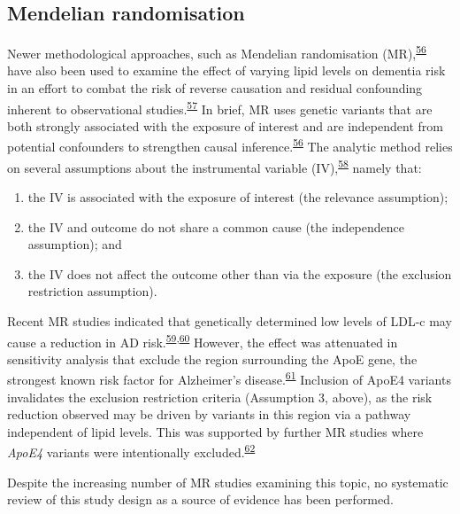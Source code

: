 \documentclass[a4paper, twoside]{templates/ociamthesis}
\providecommand{\tightlist}{%
  \setlength{\itemsep}{0pt}\setlength{\parskip}{0pt}}
\begin{document}
\hypertarget{mendelian-randomisation}{%
\subsection{Mendelian randomisation}\label{mendelian-randomisation}}

Newer methodological approaches, such as Mendelian randomisation (MR),\textsuperscript{\protect\hyperlink{ref-daveysmith2014}{56}} have also been used to examine the effect of varying lipid levels on dementia risk in an effort to combat the risk of reverse causation and residual confounding inherent to observational studies.\textsuperscript{\protect\hyperlink{ref-greenland2000}{57}} In brief, MR uses genetic variants that are both strongly associated with the exposure of interest and are independent from potential confounders to strengthen causal inference.\textsuperscript{\protect\hyperlink{ref-daveysmith2014}{56}} The analytic method relies on several assumptions about the instrumental variable (IV),\textsuperscript{\protect\hyperlink{ref-davies2018}{58}} namely that:

\begin{enumerate}
\def\labelenumi{\arabic{enumi}.}
\tightlist
\item
  the IV is associated with the exposure of interest (the relevance assumption);
\item
  the IV and outcome do not share a common cause (the independence assumption); and
\item
  the IV does not affect the outcome other than via the exposure (the exclusion restriction assumption).
\end{enumerate}

Recent MR studies indicated that genetically determined low levels of LDL-c may cause a reduction in AD risk.\textsuperscript{\protect\hyperlink{ref-larsson2017c}{59},\protect\hyperlink{ref-ostergaard2015}{60}} However, the effect was attenuated in sensitivity analysis that exclude the region surrounding the ApoE gene, the strongest known risk factor for Alzheimer's disease.\textsuperscript{\protect\hyperlink{ref-kim2009}{61}} Inclusion of ApoE4 variants invalidates the exclusion restriction criteria (Assumption 3, above), as the risk reduction observed may be driven by variants in this region via a pathway independent of lipid levels. This was supported by further MR studies where \emph{ApoE4} variants were intentionally excluded.\textsuperscript{\protect\hyperlink{ref-benn2017}{62}}

Despite the increasing number of MR studies examining this topic, no systematic review of this study design as a source of evidence has been performed.
\end{document}
